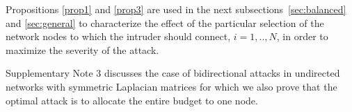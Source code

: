 \documentclass[%
 reprint,
 amsmath,amssymb,
 aip,
]{revtex4-2}
\theoremstyle{italichead}
\theoremstyle{definition}
\begin{document}
{{Propositions \ref{prop1} and \ref{prop3} are used in the next subsections \,\ref{sec:balanced} and \ref{sec:general} to characterize the effect of the particular selection of the network nodes to which the intruder should connect, $i=1,..,N$, in order to maximize the severity of the attack.}


Supplementary Note 3 discusses the case of bidirectional attacks in undirected networks with symmetric Laplacian matrices for which we also prove that the optimal attack is to allocate the entire budget to one node.




}
\end{document}
